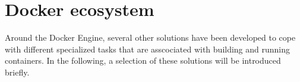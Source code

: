 







\section{Docker ecosystem} %
\label{sec:docker_ecosystem}

   Around the Docker Engine, several other solutions have been developed to cope with different specialized tasks that are asscociated with building and running containers. In the following, a selection of these solutions will be introduced briefly.

